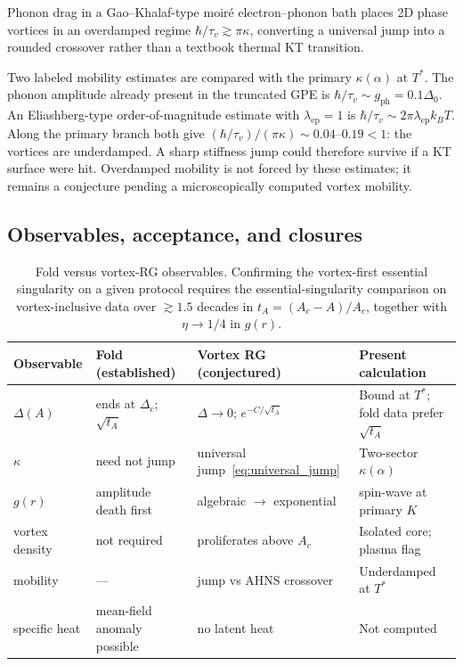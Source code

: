 \begin{hypothesis}
Phonon drag in a Gao--Khalaf-type moir\'e electron--phonon bath places 2D phase vortices in an overdamped regime $\hbar/\tau_v\gtrsim\pi\kappa$, converting a universal jump into a rounded crossover rather than a textbook thermal KT transition.
\end{hypothesis}

Two labeled mobility estimates are compared with the primary $\kappa(\alpha)$ at $T^*$. The phonon amplitude already present in the truncated GPE is $\hbar/\tau_v\sim g_{\mathrm{ph}}=0.1\Delta_0$. An Eliashberg-type order-of-magnitude estimate with $\lambda_{\mathrm{ep}}=1$ is $\hbar/\tau_v\sim 2\pi\lambda_{\mathrm{ep}}k_BT$. Along the primary branch both give $(\hbar/\tau_v)/(\pi\kappa)\sim 0.04$--$0.19<1$: the vortices are underdamped. A sharp stiffness jump could therefore survive if a KT surface were hit. Overdamped mobility is not forced by these estimates; it remains a conjecture pending a microscopically computed vortex mobility.

\subsection{Observables, acceptance, and closures}
\label{sec:vrg_obs}

\begin{table}[htbp]
\centering
\caption{Fold versus vortex-RG observables. Confirming the vortex-first essential singularity on a given protocol requires the essential-singularity comparison on vortex-inclusive data over $\gtrsim 1.5$ decades in $t_A=(A_c-A)/A_c$, together with $\eta\to 1/4$ in $g(r)$.}
\label{tab:vrg_obs}
\small
\begin{tabular}{@{}llll@{}}
\toprule
Observable & Fold (established) & Vortex RG (conjectured) & Present calculation \\
\midrule
$\Delta(A)$ & ends at $\Delta_c$; $\sqrt{t_A}$ & $\Delta\to 0$; $e^{-C/\sqrt{t_A}}$ & Bound at $T^*$; fold data prefer $\sqrt{t_A}$ \\
$\kappa$ & need not jump & universal jump~\eqref{eq:universal_jump} & Two-sector $\kappa(\alpha)$ \\
$g(r)$ & amplitude death first & algebraic $\to$ exponential & spin-wave at primary $K$ \\
vortex density & not required & proliferates above $A_c$ & Isolated core; plasma flag \\
mobility & --- & jump vs AHNS crossover & Underdamped at $T^*$ \\
specific heat & mean-field anomaly possible & no latent heat & Not computed \\
\bottomrule
\end{tabular}
\end{table}

